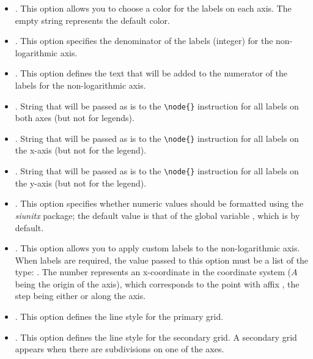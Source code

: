 \begin{itemize}
\begin{itemize}
    \item {}. This option allows you to choose a color for the labels on each axis. The empty string represents the default color.
    
    \item {}. ​​This option specifies the denominator of the labels (integer) for the non-logarithmic axis.
    
    \item {}. This option defines the text that will be added to the numerator of the labels for the non-logarithmic axis.
    
    \item {}. String that will be passed as is to the \verb|\node{}| instruction for all labels on both axes (but not for legends).
    
    \item {}. String that will be passed as is to the \verb|\node{}| instruction for all labels on the x-axis (but not for the legend).
    
    \item {}. String that will be passed as is to the \verb|\node{}| instruction for all labels on the y-axis (but not for the legend).
    
    \item {}. This option specifies whether numeric values ​​should be formatted using the \emph{siunitx} package; the default value is that of the global variable , which is \false by default.
    
    \item {}. This option allows you to apply custom labels to the non-logarithmic axis. When labels are required, the value passed to this option must be a list of the type: . The number  represents an x-coordinate in the coordinate system  ($A$ being the origin of the axis), which corresponds to the point with affix , the step being either  or  along the axis.
    
    \item {}. This option defines the line style for the primary grid.
    
    \item {}. This option defines the line style for the secondary grid. A secondary grid appears when there are subdivisions on one of the axes.
    

\end{itemize}
\end{itemize}
